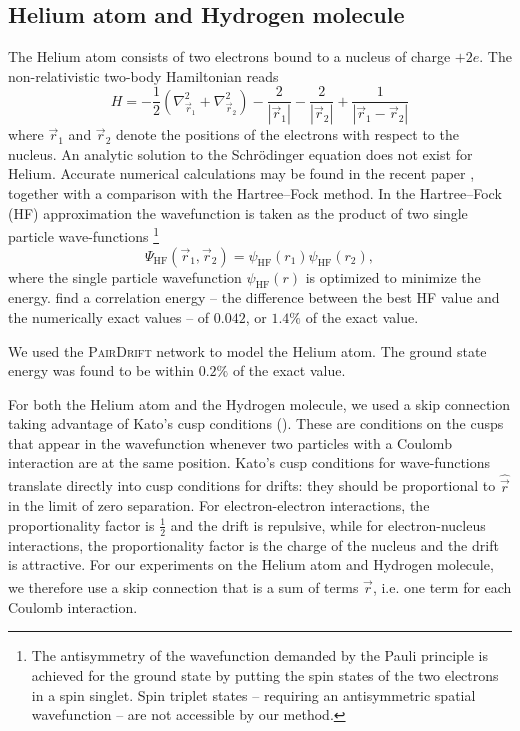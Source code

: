\documentclass[12pt]{msml2020} %
\newcommand*{\br}{\vec{r}}
\begin{document}
\subsection{Helium atom and Hydrogen molecule}
The Helium atom consists of two electrons bound to a nucleus of charge $+2e$. The non-relativistic two-body Hamiltonian reads
%
\begin{equation}\label{eq:helium_atom_Hamiltonian} H = - \frac{1}{2}    \left(\nabla_{\br_1}^{2} + \nabla_{\br_2}^{2} \right ) -  \frac{2}{|\br_1|} - \frac{2}{|\br_2|} + \frac{1}{|\br_{1} - \br_{2}|} 
\end{equation} 
%
where $\br_{1}$ and $\br_{2}$ denote the positions of the electrons with respect to the  nucleus. An analytic solution to the Schr\"odinger equation does not exist for Helium. Accurate numerical calculations may be found in the recent paper \cite{Baskerville:2019aa}, together with a comparison with the Hartree--Fock method. In the Hartree--Fock (HF) approximation the wavefunction is taken as the product of two single particle wave-functions \footnote{The antisymmetry of the wavefunction demanded by the Pauli principle is achieved for the ground state by putting the spin states of the two electrons in a spin singlet. Spin triplet states -- requiring an antisymmetric spatial wavefunction -- are not accessible by our method.}
%
\begin{equation}\label{eq:helium_wave} 
\Psi_{\text{HF}}\left(\br_1 , \br_2\right) = \psi_{\text{HF}}\left(r_1\right)\psi_{\text{HF}}\left(r_2\right),
\end{equation}
%
where the single particle wavefunction $\psi_\text{HF}(r)$ is optimized to minimize the energy. \cite{Baskerville:2019aa} find a correlation energy -- the difference between the best HF value and the numerically exact values -- of $0.042$, or $1.4 \%$ of the exact value.

We used the \textsc{PairDrift} network to model the Helium atom. The ground state energy was found to be within $0.2\%$ of the exact value. %

For both the Helium atom and the Hydrogen molecule, we used a skip connection taking advantage of Kato's cusp conditions (\cite{Kato:1957aa}). These are conditions on the cusps that appear in the wavefunction whenever two particles with a Coulomb interaction are at the same position. Kato's cusp conditions for wave-functions translate directly into cusp conditions for drifts: they should be proportional to $\hat{\br}$ in the limit of zero separation. For electron-electron interactions, the proportionality factor is $\frac{1}{2}$ and the drift is repulsive, while for electron-nucleus interactions, the proportionality factor is the charge of the nucleus and the drift is attractive. For our experiments on the Helium atom and Hydrogen molecule, we therefore use a skip connection that is a sum of terms $\hat{\br}$, i.e. one term for each Coulomb interaction.
\end{document}
